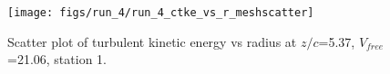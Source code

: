 \begin{figure}[H]
\centering
\texttt{[image: figs/run\_4/run\_4\_ctke\_vs\_r\_meshscatter]}
\caption{Scatter plot of turbulent kinetic energy vs radius at $z/c$=5.37, $V_{free}$=21.06, station 1.}
\label{fig:run_4_ctke_vs_r_meshscatter}
\end{figure}


